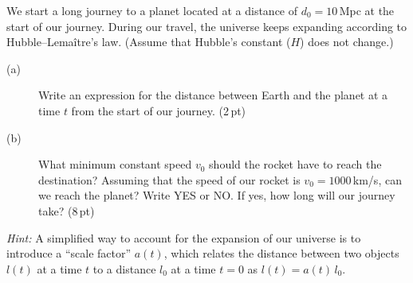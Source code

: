 We start a long journey to a planet located at a distance of
$d_0 = 10$\,Mpc at the start of our journey. During our travel, the universe
keeps expanding according to Hubble--Lema\^itre's law. (Assume that Hubble's
constant ($H$) does not change.)

\begin{description}
\item[(a)] Write an expression for the distance between Earth and the planet
  at a time $t$ from the start of our journey. \hfill(2\,pt)
\item[(b)] What minimum constant speed $v_0$ should the rocket have to reach
  the destination? Assuming that the speed of our rocket is
  $v_0 = 1000$\,km/s, can we reach the planet? Write YES or NO. If yes, how
  long will our journey take? \hfill(8\,pt)
\end{description}

\emph{Hint:} A simplified way to account for the expansion of our universe is
to introduce a ``scale factor'' $a(t)$, which relates the distance between two
objects $l(t)$ at a time $t$ to a distance $l_0$ at a time $t = 0$ as
$l(t) = a(t)\,l_0$.
